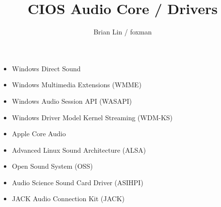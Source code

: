 \documentclass[UTF8]{ctexart}
\title{CIOS Audio Core / Drivers}
\author{Brian Lin / foxman}
\begin{document}
\maketitle

\begin{itemize}
\item Windows Direct Sound
\item Windows Multimedia Extensions (WMME)
\item Windows Audio Session API (WASAPI)
\item Windows Driver Model Kernel Streaming (WDM-KS)
\item Apple Core Audio
\item Advanced Linux Sound Architecture (ALSA)
\item Open Sound System (OSS)
\item Audio Science Sound Card Driver (ASIHPI)
\item JACK Audio Connection Kit (JACK)
\end{itemize}
\end{document}
